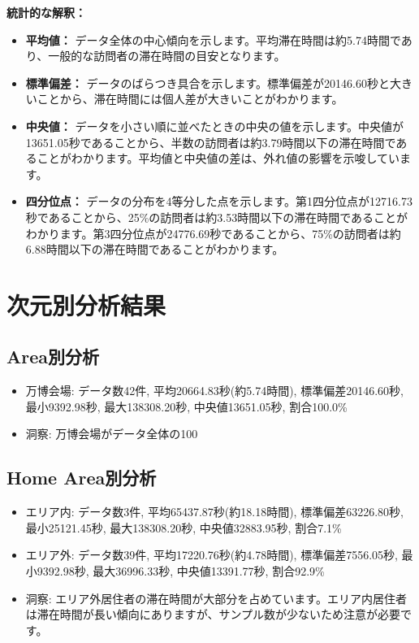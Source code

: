 \documentclass[11pt,a4paper]{article}
\begin{document}
\textbf{統計的な解釈：}

\begin{itemize}
    \item \textbf{平均値：} データ全体の中心傾向を示します。平均滞在時間は約5.74時間であり、一般的な訪問者の滞在時間の目安となります。
    \item \textbf{標準偏差：} データのばらつき具合を示します。標準偏差が20146.60秒と大きいことから、滞在時間には個人差が大きいことがわかります。
    \item \textbf{中央値：} データを小さい順に並べたときの中央の値を示します。中央値が13651.05秒であることから、半数の訪問者は約3.79時間以下の滞在時間であることがわかります。平均値と中央値の差は、外れ値の影響を示唆しています。
    \item \textbf{四分位点：} データの分布を4等分した点を示します。第1四分位点が12716.73秒であることから、25\%の訪問者は約3.53時間以下の滞在時間であることがわかります。第3四分位点が24776.69秒であることから、75\%の訪問者は約6.88時間以下の滞在時間であることがわかります。
\end{itemize}

\section{次元別分析結果}

\subsection{Area別分析}

\begin{itemize}
    \item 万博会場: データ数42件, 平均20664.83秒(約5.74時間), 標準偏差20146.60秒, 最小9392.98秒, 最大138308.20秒, 中央値13651.05秒, 割合100.0\%
    \item 洞察: 万博会場がデータ全体の100%
\end{itemize}

\subsection{Home Area別分析}

\begin{itemize}
    \item エリア内: データ数3件, 平均65437.87秒(約18.18時間), 標準偏差63226.80秒, 最小25121.45秒, 最大138308.20秒, 中央値32883.95秒, 割合7.1\%
    \item エリア外: データ数39件, 平均17220.76秒(約4.78時間), 標準偏差7556.05秒, 最小9392.98秒, 最大36996.33秒, 中央値13391.77秒, 割合92.9\%
    \item 洞察: エリア外居住者の滞在時間が大部分を占めています。エリア内居住者は滞在時間が長い傾向にありますが、サンプル数が少ないため注意が必要です。
\end{itemize}
\end{document}
